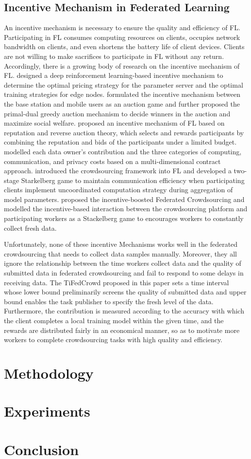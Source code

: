 \documentclass[final,1p,times]{elsarticle}
\begin{document}
\subsection{Incentive Mechanism in Federated Learning}
An incentive mechanism is necessary to ensure the quality and efficiency of FL. Participating in FL consumes computing resources on clients, occupies network bandwidth on clients, and even shortens the battery life of client devices. Clients are not willing to make sacrifices to participate in FL without any return. Accordingly, there is a growing body of research on the incentive mechanism of FL. \cite{zhan2020learn} designed a deep reinforcement learning-based incentive mechanism to determine the optimal pricing strategy for the parameter server and the optimal training strategies for edge nodes. \cite{le2021incentive} formulated the incentive mechanism between the base station and mobile users as an auction game and further proposed the primal-dual greedy auction mechanism to decide winners in the auction and maximize social welfare. \cite{zhang2021incentive} proposed an incentive mechanism of FL based on reputation and reverse auction theory, which selects and rewards participants by combining the reputation and bids of the participants under a limited budget. \cite{9317806} modelled each data owner's contribution and the three categories of computing, communication, and privacy costs based on a multi-dimensional contract approach. \cite{pandey2019incentivize} introduced the crowdsourcing framework into FL and developed a two-stage Starkelberg game to maintain communication efficiency when participating clients implement uncoordinated computation strategy during aggregation of model parameters. \cite{kang2022incentive} proposed the incentive-boosted Federated Crowdsourcing and modelled the incentive-based interaction between the crowdsourcing platform and participating workers as a Stackelberg game to encourages workers to constantly collect fresh data.

Unfortunately, none of these incentive Mechanisms works well in the federated crowdsourcing that needs to collect data samples manually. Moreover, they all ignore the relationship between the time workers collect data and the quality of submitted data in federated crowdsourcing and fail to respond to some delays in receiving data. The TiFedCrowd proposed in this paper sets a time interval whose lower bound preliminarily screens the quality of submitted data and upper bound enables the task publisher to specify the fresh level of the data. Furthermore, the contribution is measured according to the accuracy with which the client completes a local training model within the given time, and the rewards are distributed fairly in an economical manner, so as to motivate more workers to complete crowdsourcing tasks with high quality and efficiency.

\section{Methodology} \label{sec:mtd}
\section{Experiments} \label{sec:exp}
\section{Conclusion} \label{sec:con}


\end{document}
